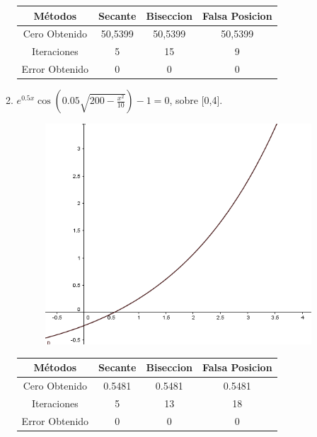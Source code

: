\documentclass{udparticle}
\begin{document}
\begin{enumerate}
\begin{enumerate}
\begin{table}[H]
\begin{tabular} { |c|c|c|c|}
        \hline
        Métodos       & Secante & Biseccion & Falsa Posicion  \\
        \hline
        Cero Obtenido &  50,5399       &    50,5399       &      50,5399          \\
        \hline
        Iteraciones   &     5        &      15     &        9        \\
        \hline
        Error Obtenido &    0       &       0       &       0   \\
        \hline 
        
        \end{tabular}
    \end{table}
\newpage

\item \(e^{0.5x}\cos(0.05\sqrt{200-\frac{x^2}{10}}) -1 = 0 \), sobre [0,4].\\
    
    \begin{figure}[H]
    \centering
    \includegraphics[width=10cm]{GraficoEj1d}
    \end{figure}
    \begin{table}[H]
    \centering
        \begin{tabular} { |c|c|c|c|}
        
        \hline
        Métodos       & Secante & Biseccion & Falsa Posicion \\
        \hline
        Cero Obtenido &  0.5481       &    0.5481       &      0.5481          \\
        \hline
        Iteraciones   &     5        &      13     &        18       \\
        \hline
        Error Obtenido   &  0 & 0 & 0 \\
        \hline
        

\end{tabular}
\end{table}
\end{enumerate}
\end{enumerate}
\end{document}
